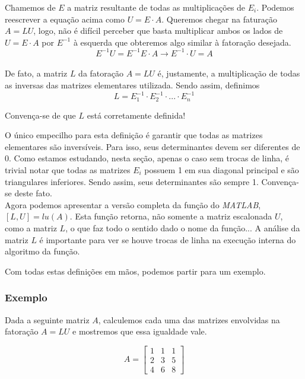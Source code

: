 \documentclass[12pt]{article}
\begin{document}
Chamemos de $E$ a matriz resultante de todas as multiplicações de $E_i$. Podemos reescrever a equação acima como $U=E\cdot A$. Queremos chegar na faturação $A=LU$, logo, não é difícil perceber que basta multiplicar ambos os lados de $U=E\cdot A$ por $E^{-1}$ à esquerda que obteremos algo similar à fatoração desejada.
\begin{equation*}
	E^{-1}U=E^{-1}E\cdot A \rightarrow E^{-1}\cdot U=A
\end{equation*}\\

De fato, a matriz $L$ da fatoração $A=LU$ é, justamente, a multiplicação de todas as inversas das matrizes elementares utilizada. Sendo assim, definimos
\begin{equation*}
	L=E_1^{-1}\cdot E_2^{-1}\cdot ... \cdot E_n^{-1}
\end{equation*}

Convença-se de que $L$ está corretamente definida!

O único empecilho para esta definição é garantir que todas as matrizes elementares são inversíveis. Para isso, seus determinantes devem ser diferentes de 0. Como estamos estudando, nesta seção, apenas o caso sem trocas de linha, é trivial notar que todas as matrizes $E_i$ possuem 1 em sua diagonal principal e são triangulares inferiores. Sendo assim, seus determinantes são sempre 1. Convença-se deste fato.\\

Agora podemos apresentar a versão completa da função do \textit{MATLAB}, $[L,U]=lu(A)$. Esta função retorna, não somente a matriz escalonada $U$, como a matriz $L$, o que faz todo o sentido dado o nome da função... A análise da matriz $L$ é importante para ver se houve trocas de linha na execução interna do algoritmo da função.

Com todas estas definições em mãos, podemos partir para um exemplo.
\subsubsection{Exemplo}
Dada a seguinte matriz $A$, calculemos cada uma das matrizes envolvidas na fatoração $A=LU$ e mostremos que essa igualdade vale.

\begin{equation*}
	A=\begin{bmatrix}
		1 & 1 & 1\\
		2 & 3 & 5\\
		4 & 6 & 8
	\end{bmatrix} 
\end{equation*}\\
\end{document}
